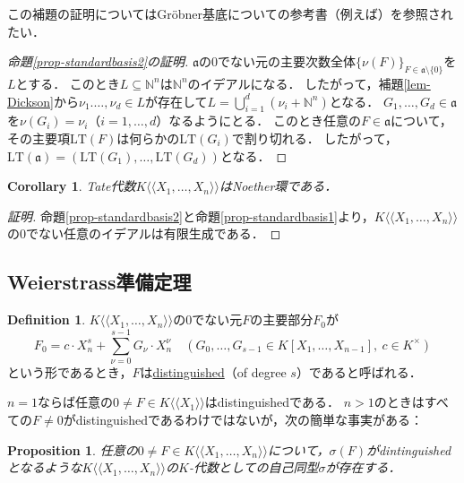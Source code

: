 \documentclass[a4paper,12pt, dvipdfmx]{jsbook}
\def\N{\mathbb{N}}
\def\dl{\langle\!\langle}
\def\dr{\rangle\!\rangle}
\def\LT{\mathrm{LT}}
\theoremstyle{plain}
\newtheorem{prop}[thm]{\bfseries Proposition}
\newtheorem{cor}[thm]{\bfseries Corollary}
\theoremstyle{definition}
\newtheorem{dfn}[thm]{\bfseries Definition}
\begin{document}
この補題の証明についてはGr\"obner基底についての参考書（例えば\cite[Exercises 1.4.11, 1.4.12, 1.4.13]{AL}）を参照されたい．

\begin{proof}[命題{\rm \ref{prop-standardbasis2}}の証明]
$\mathfrak{a}$の$0$でない元の主要次数全体$\{\nu(F)\}_{F\in\mathfrak{a}\setminus\{0\}}$を$L$とする．
このとき$L\subseteq\N^n$は$\N^n$のイデアルになる．
したがって，補題\ref{lem-Dickson}から$\nu_1.\ldots,\nu_d\in L$が存在して$L=\bigcup^d_{i=1}(\nu_i+\N^n)$となる．
$G_1,\ldots,G_d\in\mathfrak{a}$を$\nu(G_i)=\nu_i$（$i=1,\ldots,d$）なるようにとる．
このとき任意の$F\in\mathfrak{a}$について，その主要項$\LT(F)$は何らかの$\LT(G_i)$で割り切れる．
したがって，$\LT(\mathfrak{a})=(\LT(G_1),\ldots,\LT(G_d))$となる．
\end{proof}

\begin{cor}\label{cor-standardbasis2}{\rm 
Tate代数$K\dl X_1,\ldots,X_n\dr$はNoether環である．}
\end{cor}

\begin{proof}[証明]
命題\ref{prop-standardbasis2}と命題\ref{prop-standardbasis1}より，$K\dl X_1,\ldots,X_n\dr$の$0$でない任意のイデアルは有限生成である．
\end{proof}

\subsection{Weierstrass準備定理}\label{sub-Weierstrasspreparation}
\begin{dfn}\label{dfn-distinguished}{\rm 
$K\dl X_1,\ldots,X_n\dr$の$0$でない元$F$の主要部分$F_0$が
$$
F_0=c\cdot X^s_n+\sum^{s-1}_{\nu=0}G_{\nu}\cdot X^{\nu}_n\quad (G_0,\ldots,G_{s-1}\in K[X_1,\ldots,X_{n-1}],\ c\in K^{\times})
$$
という形であるとき，$F$は\underline{distinguished}（of degree $s$）であると呼ばれる．}
\end{dfn}

$n=1$ならば任意の$0\neq F\in K\dl X_1\dr$はdistinguishedである．
$n>1$のときはすべての$F\neq 0$がdistinguishedであるわけではないが，次の簡単な事実がある：
\begin{prop}\label{prop-distinguished}{\rm 
任意の$0\neq F\in K\dl X_1,\ldots,X_n\dr$について，$\sigma(F)$がdintinguishedとなるような$K\dl X_1,\ldots,X_n\dr$の$K$-代数としての自己同型$\sigma$が存在する．}
\end{prop}
\end{document}
